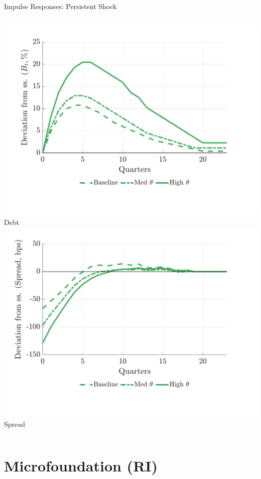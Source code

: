 \documentclass[aspectratio=169,11pt,professionalfonts]{beamer}
\newcommand{\1}{\mathbb{1}}
\begin{document}
\begin{frame}{Impulse Responses: Persistent Shock}
\begin{columns}[T,onlytextwidth]
    \includegraphics[width=\linewidth]{../../pro-default-model/results/comparison_figure_18.pdf}\\[-0.5em]
    {\scriptsize Debt}
    \includegraphics[width=\linewidth]{../../pro-default-model/results/comparison_figure_20.pdf}\\[-0.5em]
    {\scriptsize Spread}
  \end{columns}
\end{frame}

\section{Microfoundation (RI)}
\end{document}
